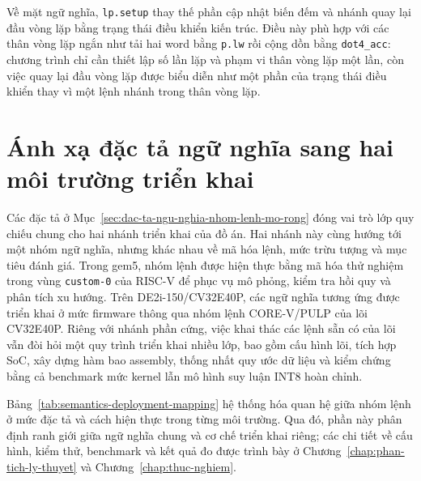 \documentclass[../DoAn.tex]{subfiles}
\begin{document}
Về mặt ngữ nghĩa, \texttt{lp.setup} thay thế phần cập nhật biến đếm và nhánh quay lại đầu vòng lặp bằng trạng thái điều khiển kiến trúc. Điều này phù hợp với các thân vòng lặp ngắn như tải hai word bằng \texttt{p.lw} rồi cộng dồn bằng \texttt{dot4\_acc}: chương trình chỉ cần thiết lập số lần lặp và phạm vi thân vòng lặp một lần, còn việc quay lại đầu vòng lặp được biểu diễn như một phần của trạng thái điều khiển thay vì một lệnh nhánh trong thân vòng lặp.

\section{Ánh xạ đặc tả ngữ nghĩa sang hai môi trường triển khai}
\label{sec:anh-xa-dac-ta-sang-hai-moi-truong}

Các đặc tả ở Mục~\ref{sec:dac-ta-ngu-nghia-nhom-lenh-mo-rong} đóng vai trò lớp quy chiếu chung cho hai nhánh triển khai của đồ án. Hai nhánh này cùng hướng tới một nhóm ngữ nghĩa, nhưng khác nhau về mã hóa lệnh, mức trừu tượng và mục tiêu đánh giá. Trong gem5, nhóm lệnh được hiện thực bằng mã hóa thử nghiệm trong vùng \texttt{custom-0} của RISC-V để phục vụ mô phỏng, kiểm tra hồi quy và phân tích xu hướng. Trên DE2i-150/CV32E40P, các ngữ nghĩa tương ứng được triển khai ở mức firmware thông qua nhóm lệnh CORE-V/PULP của lõi CV32E40P. Riêng với nhánh phần cứng, việc khai thác các lệnh sẵn có của lõi vẫn đòi hỏi một quy trình triển khai nhiều lớp, bao gồm cấu hình lõi, tích hợp SoC, xây dựng hàm bao assembly, thống nhất quy ước dữ liệu và kiểm chứng bằng cả benchmark mức kernel lẫn mô hình suy luận INT8 hoàn chỉnh.

Bảng~\ref{tab:semantics-deployment-mapping} hệ thống hóa quan hệ giữa nhóm lệnh ở mức đặc tả và cách hiện thực trong từng môi trường. Qua đó, phần này phân định ranh giới giữa ngữ nghĩa chung và cơ chế triển khai riêng; các chi tiết về cấu hình, kiểm thử, benchmark và kết quả đo được trình bày ở Chương~\ref{chap:phan-tich-ly-thuyet} và Chương~\ref{chap:thuc-nghiem}.
\end{document}
